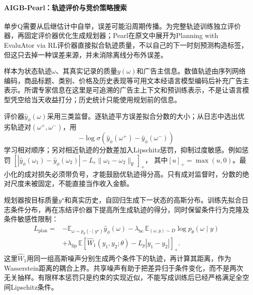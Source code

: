 \paragraph{AIGB-Pearl：轨迹评价与竞价策略搜索}
\label{sec:rs-advertising-pearl}

单步Q需要从后继估计中自举，误差可能沿周期传播。为完整轨迹训练独立评价器，再固定评价器优化生成规划器；Pearl在原文中展开为Planning with EvaluAtor via RL评价器直接拟合轨迹质量，不以自己的下一时刻预测构造标签，但这只去掉一种误差来源，并未消除离线分布外误差。

样本为状态轨迹$\omega$、其真实记录的质量$y(\omega)$和广告主信息。数值轨迹由序列网络编码，商品标题、类别、价格及历史表现等可用文本经语言模型编码后补充广告主表示。所谓专家信息在这里是可追溯的广告主上下文和预训练表示，不是让语言模型凭空给当天收益打分；历史统计只能使用规划前的信息。

评价器$\widehat y_\phi(\omega)$采用三类监督。逐轨迹平方误差拟合分数的大小；从日志中选出优劣轨迹对$(\omega^+,\omega^-)$，用
\[
  -\log\sigma\!\left(
       \widehat y_\phi(\omega^+)-\widehat y_\phi(\omega^-)\right)
\]
学习相对顺序；另对相近轨迹的分数差加入Lipschitz惩罚，抑制过度敏感。例如惩罚
$[|\widehat y_\phi(\omega_1)-\widehat y_\phi(\omega_2)|
  -L_e\|\omega_1-\omega_2\|_{\mathrm F}]_+$，
其中$[u]_+=\max(u,0)$。最小化的成对损失必须带负号，才能鼓励优轨迹得分高。只有成对监督时，分数的绝对尺度未被固定，不能直接当作收入金额。

规划器按目标质量$y^\star$和真实历史，自回归生成下一状态的高斯分布。训练先拟合日志条件分布，再在冻结评价器下提高所生成轨迹的得分，同时保留条件行为克隆及条件敏感性限制：
\begin{equation}
  \begin{aligned}
    L_{\mathrm{plan}}
      ={}&-\mathbb{E}_{\omega\sim p_\theta(\cdot\mid y^\star)}
                  \widehat y_\phi(\omega)
       -\lambda_{\mathrm{bc}}\,
          \mathbb{E}_{(\omega,y)\sim D}\log p_\theta(\omega\mid y)\\
       &+\lambda_{\mathrm{lip}}\,
          \mathbb{E}\left[
          \widehat W_1(y_1,y_2;\theta)-L_p|y_1-y_2|
          \right]_+ .
  \end{aligned}
  \label{eq:rs-advertising-pearl}
\end{equation}
这里$\widehat W_1$用同一组高斯噪声分别生成两个条件下的轨迹，再计算其距离，作为Wasserstein距离的耦合上界。共享噪声有助于把差异归于条件变化，而不是两次无关抽样。有限样本惩罚只是约束的实现近似，不能写成训练后已经严格满足全空间Lipschitz条件。


